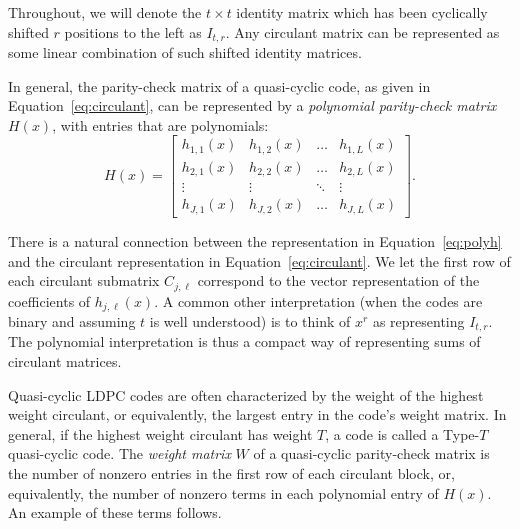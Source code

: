 \documentclass[11pt]{amsart}
\theoremstyle{definition}
\newcommand{\0}{\mathbf{0}}
\begin{document}
Throughout, we will denote the $t \times t$ identity matrix which has been cyclically shifted $r$ positions to the left as $I_{t,r}$. Any circulant matrix can be represented as some linear combination of such shifted identity matrices.

In general, the parity-check matrix of a quasi-cyclic code, as given in Equation~\ref{eq:circulant}, can be represented by a \textit{polynomial parity-check matrix} $H(x)$, with entries that are polynomials:
\begin{equation}
    H(x) = \begin{bmatrix} h_{1,1}(x) & h_{1,2}(x) & \dots & h_{1,L}(x) \\
    h_{2,1}(x) & h_{2,2}(x) & \dots & h_{2,L}(x) \\
    \vdots & \vdots & \ddots & \vdots \\
    h_{J,1}(x) & h_{J,2}(x) & \dots & h_{J,L}(x)\end{bmatrix}. \label{eq:polyh}
\end{equation}

There is a natural connection between the representation in Equation~\ref{eq:polyh} and the circulant representation in Equation~\ref{eq:circulant}. We let the first row of each circulant submatrix $C_{j,\ell}$ correspond to the vector representation of the coefficients of $h_{j,\ell}(x)$. A common other interpretation (when the codes are binary and assuming $t$ is well understood) is to think of $x^r$ as representing $I_{t,r}$. The polynomial interpretation is thus a compact way of representing sums of circulant matrices.

Quasi-cyclic LDPC codes are often characterized by the weight of the highest weight circulant, or equivalently, the largest entry in the code's weight matrix. In general, if the highest weight circulant has weight $T$, a code is called a Type-$T$ quasi-cyclic code. The \textit{weight matrix} $W$ of a quasi-cyclic parity-check matrix is the number of nonzero entries in the first row of each circulant block, or, equivalently, the number of nonzero terms in each polynomial entry of $H(x)$. An example of these terms follows.
\end{document}
